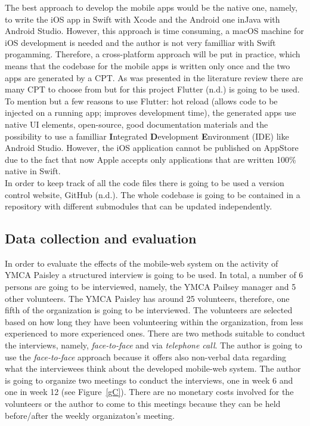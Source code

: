 \documentclass[version=last,fontsize=13pt]{scrartcl}
\begin{document}
	The best approach to develop the mobile apps would be the native one, namely, to write the iOS app in Swift with Xcode and the Android one inJava with Android Studio. However, this approach is time consuming, a macOS machine for iOS development is needed and the author is not very familliar with Swift progamming. Therefore, a cross-platform approach will be put in practice, which means that the codebase for the mobile apps is written only once and the two apps are generated by a CPT. As was presented in the literature review there are many CPT to choose from but for this project Flutter (n.d.) is going to be used. To mention but a few reasons to use Flutter: hot reload (allows code to be injected on a running app; improves development time), the generated apps use native UI elements, open-source, good documentation materials and the possibility to use a familliar \textbf{I}ntegrated \textbf{D}evelopment \textbf{E}nvironment (IDE) like Android Studio. However, the iOS application cannot be published on AppStore due to the fact that now Apple accepts only applications that are written 100\% native in Swift.\\
	\indent
	In order to keep track of all the code files there is going to  be used a version control website, GitHub (n.d.). The whole codebase is going to be contained in a repository with different submodules that can be updated independently. 
	

\subsection{Data collection and evaluation}
	In order to evaluate the effects of the mobile-web system on the activity of YMCA Paisley a structured interview is going to be used. In total, a number of 6 persons are going to be interviewed, namely, the YMCA Pailsey manager and 5 other volunteers. The YMCA Paisley has around 25 volunteers, therefore, one fifth of the organization is going to be interviewed. The volunteers are selected based on how long they have been volunteering within the organization, from less experienced to more experienced ones. There are two methods suitable to conduct the interviews, namely, \textit{face-to-face} and via \textit{telephone call}. %
	The author is going to use the \textit{face-to-face} approach because it offers also non-verbal data regarding what the interviewees think about the developed mobile-web system.  The author is going to organize two meetings to conduct the interviews, one in week 6 and one in week 12 (see Figure~\ref{gC}). There are no monetary costs involved for the volunteers or the author to come to this meetings because they can be held before/after the weekly organizaton's meeting.
\end{document}
